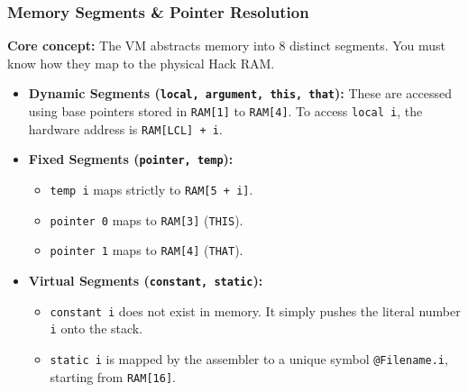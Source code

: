 \documentclass[12pt,a4paper]{article}
\begin{document}
\subsubsection*{Memory Segments \& Pointer Resolution}
\textbf{Core concept:} The VM abstracts memory into 8 distinct segments. You must know how they map to the physical Hack RAM.
\begin{itemize}
    \item \textbf{Dynamic Segments (\texttt{local, argument, this, that}):} These are accessed using base pointers stored in \texttt{RAM[1]} to \texttt{RAM[4]}. To access \texttt{local i}, the hardware address is \texttt{RAM[LCL] + i}.
    \item \textbf{Fixed Segments (\texttt{pointer, temp}):} 
    \begin{itemize}
        \item \texttt{temp i} maps strictly to \texttt{RAM[5 + i]}.
        \item \texttt{pointer 0} maps to \texttt{RAM[3]} (\texttt{THIS}).
        \item \texttt{pointer 1} maps to \texttt{RAM[4]} (\texttt{THAT}).
    \end{itemize}
    \item \textbf{Virtual Segments (\texttt{constant, static}):}
    \begin{itemize}
        \item \texttt{constant i} does not exist in memory. It simply pushes the literal number \texttt{i} onto the stack.
        \item \texttt{static i} is mapped by the assembler to a unique symbol \texttt{@Filename.i}, starting from \texttt{RAM[16]}.
    \end{itemize}
\end{itemize}
\end{document}
